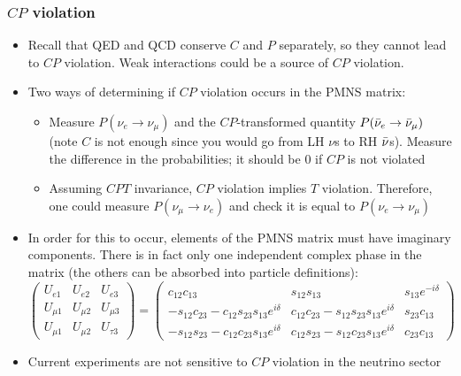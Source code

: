 \subsubsection{$CP$ violation}
\begin{itemize}
  \item Recall that QED and QCD conserve $C$ and $P$ separately, so they cannot lead to $CP$ violation. Weak interactions could be a source of $CP$ violation.
  \item Two ways of determining if $CP$ violation occurs in the PMNS matrix:
  \begin{itemize}
    \item Measure $P(\nu_e\rightarrow\nu_\mu)$ and the $CP$-transformed quantity $P({\bar{\nu}}_e\rightarrow{\bar{\nu}}_\mu)$ (note $C$ is not enough since you would go from LH $\nu$s to RH ${\bar{\nu}}$s). Measure the difference in the probabilities; it should be $0$ if $CP$ is not violated
    \item Assuming $CPT$ invariance, $CP$ violation implies $T$ violation. Therefore, one could measure $P(\nu_\mu\rightarrow \nu_e)$ and check it is equal to $P(\nu_e\rightarrow\nu_\mu)$
  \end{itemize}
  \item In order for this to occur, elements of the PMNS matrix must have imaginary components. There is in fact only one independent complex phase in the matrix (the others can be absorbed into particle definitions):
  \begin{equation}
    \begin{pmatrix} 
      U_{e1} & U_{e2} & U_{e3} \\
      U_{\mu1} & U_{\mu2} & U_{\mu3} \\
      U_{\mu1} & U_{\mu2} & U_{\tau3} 
    \end{pmatrix} = 
    \begin{pmatrix} 
      c_{12}c_{13} & s_{12}s_{13} & s_{13}e^{-i\delta} \\
      -s_{12}c_{23}-c_{12}s_{23}s_{13}e^{i\delta} & c_{12}c_{23}-s_{12}s_{23}s_{13}e^{i\delta} & s_{23}c_{13}\\
      -s_{12}s_{23}-c_{12}c_{23}s_{13}e^{i\delta} & c_{12}s_{23}-s_{12}c_{23}s_{13}e^{i\delta} & c_{23}c_{13}
    \end{pmatrix}   
  \end{equation}
  \item Current experiments are not sensitive to $CP$ violation in the neutrino sector
\end{itemize}

